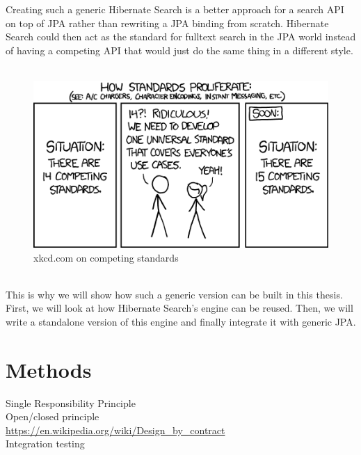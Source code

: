 \pagebreak
\noindent
Creating such a generic Hibernate Search is a better approach for a search API on top of JPA rather than rewriting a JPA binding from scratch. Hibernate Search could then act as the standard for fulltext search in the JPA world instead of having a competing API that would just do the same thing in a different style.
\\\\
\begin{figure}[ht]
	\centering
	\includegraphics[scale=0.5]{images/competing_standards.png}
	\caption{xkcd.com on competing standards \protect\footnotemark}
	\label{xkcd_standards_fig}
\end{figure}
\\
This is why we will show how such a generic version can be built in this thesis. First, we will look at how Hibernate Search's engine can be reused. Then, we will write a standalone version of this engine and finally integrate it with generic JPA.

\pagebreak

\section{Methods} \label{Methods}

Single Responsibility Principle
\\
Open/closed principle
\\
\url{https://en.wikipedia.org/wiki/Design_by_contract}
\\
Integration testing




\pagebreak
